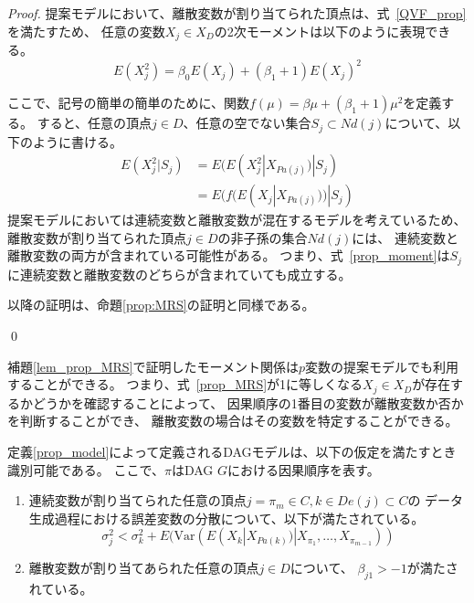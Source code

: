 \begin{proof}
  提案モデルにおいて、離散変数が割り当てられた頂点は、式~\eqref{QVF_prop}を満たすため、
  任意の変数$X_j \in X_D$の2次モーメントは以下のように表現できる。
  \begin{equation*}
    E(X_j^2) = \beta_0 E(X_j) + (\beta_1 + 1)E(X_j)^2
  \end{equation*}

  ここで、記号の簡単の簡単のために、関数$f(\mu) = \beta \mu + (\beta_1 + 1) \mu^2$を定義する。
  すると、任意の頂点$j \in D$、任意の空でない集合$S_j \subset Nd(j)$について、以下のように書ける。
  \begin{equation}
    \begin{split}
      E(X_j^2 | S_j) &= E(E(X_j^2 | X_{Pa(j)}) | S_j) \\
                     &= E(f(E(X_j | X_{Pa(j)})) | S_j)
    \end{split}
    \label{prop_moment}
  \end{equation}
  提案モデルにおいては連続変数と離散変数が混在するモデルを考えているため、
  離散変数が割り当てられた頂点$j \in D$の非子孫の集合$\mathit{Nd}(j)$には、
  連続変数と離散変数の両方が含まれている可能性がある。
  つまり、式~\eqref{prop_moment}は$S_j$に連続変数と離散変数のどちらが含まれていても成立する。

  以降の証明は、命題\ref{prop:MRS}の証明と同様である。

  \qed
\end{proof}

補題\ref{lem_prop_MRS}で証明したモーメント関係は$p$変数の提案モデルでも利用することができる。
つまり、式~\eqref{prop_MRS}が1に等しくなる$X_j \in X_D$が存在するかどうかを確認することによって、
因果順序の1番目の変数が離散変数か否かを判断することができ、
離散変数の場合はその変数を特定することができる。

\begin{theo}[提案モデルの識別可能性]
  \label{theo:prop_identifiability}
  定義\ref{prop_model}によって定義されるDAGモデルは、以下の仮定を満たすとき識別可能である。
  ここで、$\pi$はDAG $G$における因果順序を表す。
  \begin{enumerate}[label=(\Alph*)]
    \item
    連続変数が割り当てられた任意の頂点$j = \pi_m \in C, k \in De(j) \subset C$の
    データ生成過程における誤差変数の分散について、以下が満たされている。
    \begin{equation*}
      \sigma_j^2 < \sigma_k^2 + E(\mathrm{Var}(E(X_k | X_{Pa(k)}) | X_{\pi_1}, \dots, X_{\pi_{m-1}}))
    \end{equation*}

    \item
    離散変数が割り当てあられた任意の頂点$j \in D$について、
    $\beta_{j1} > -1$が満たされている。
  \end{enumerate}
\end{theo}

